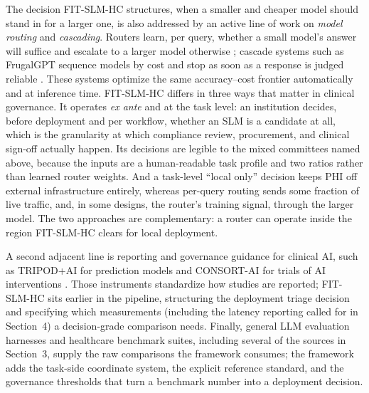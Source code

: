 \documentclass[11pt]{article}
\begin{document}
The decision FIT-SLM-HC structures, when a smaller and cheaper model should stand in for a larger one, is also addressed by an active line of work on \emph{model routing} and \emph{cascading}. Routers learn, per query, whether a small model's answer will suffice and escalate to a larger model otherwise \cite{Ong2025RouteLLM, Ding2024HybridLLM}; cascade systems such as FrugalGPT sequence models by cost and stop as soon as a response is judged reliable \cite{Chen2024FrugalGPT}. These systems optimize the same accuracy--cost frontier automatically and at inference time. FIT-SLM-HC differs in three ways that matter in clinical governance. It operates \emph{ex ante} and at the task level: an institution decides, before deployment and per workflow, whether an SLM is a candidate at all, which is the granularity at which compliance review, procurement, and clinical sign-off actually happen. Its decisions are legible to the mixed committees named above, because the inputs are a human-readable task profile and two ratios rather than learned router weights. And a task-level ``local only'' decision keeps PHI off external infrastructure entirely, whereas per-query routing sends some fraction of live traffic, and, in some designs, the router's training signal, through the larger model. The two approaches are complementary: a router can operate inside the region FIT-SLM-HC clears for local deployment.

A second adjacent line is reporting and governance guidance for clinical AI, such as TRIPOD+AI for prediction models \cite{Collins2024TRIPODAI} and CONSORT-AI for trials of AI interventions \cite{Liu2020CONSORTAI}. Those instruments standardize how studies are reported; FIT-SLM-HC sits earlier in the pipeline, structuring the deployment triage decision and specifying which measurements (including the latency reporting called for in Section~4) a decision-grade comparison needs. Finally, general LLM evaluation harnesses and healthcare benchmark suites, including several of the sources in Section~3, supply the raw comparisons the framework consumes; the framework adds the task-side coordinate system, the explicit reference standard, and the governance thresholds that turn a benchmark number into a deployment decision.
\end{document}
